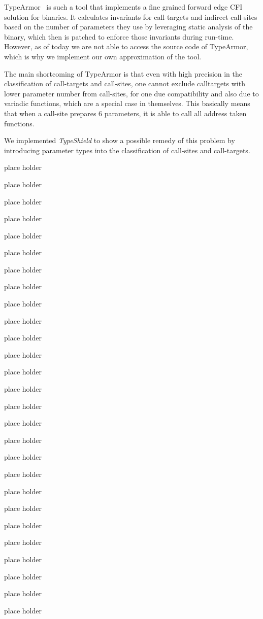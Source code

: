 TypeArmor~\cite{veen:typearmor} is such a tool that implements a fine grained forward edge CFI 
solution for binaries. It calculates invariants for call-targets and indirect call-sites based on
the number of parameters they use by leveraging static analysis of the binary, which then is
patched to enforce those invariants during run-time. However, as of today we are not able to 
access the source code of TypeArmor, which is why we implement our own approximation of the 
tool.

The main shortcoming of TypeArmor is that even with high precision in the classification of 
call-targets and call-sites, one cannot exclude calltargets with lower parameter number from 
call-sites, for one due compatibility and also due to variadic functions, which are a special
case in themselves. This basically means that when a call-site prepares 6 parameters, it is 
able to call all address taken functions.

We implemented \textit{TypeShield} to show a possible remedy of this problem by introducing
parameter types into the classification of call-sites and call-targets. 

place holder

place holder

place holder

place holder

place holder

place holder

place holder

place holder

place holder

place holder

place holder

place holder

place holder

place holder

place holder

place holder

place holder

place holder

place holder

place holder

place holder

place holder

place holder

place holder

place holder

place holder

place holder


